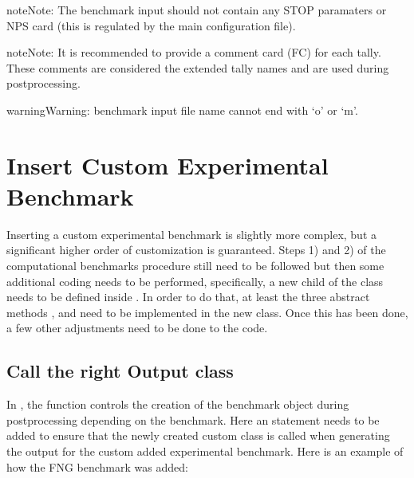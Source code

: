 \documentclass[letterpaper,10pt,english]{sphinxmanual}
\begin{document}
\begin{sphinxadmonition}{note}{Note:}
The benchmark input should not contain any STOP paramaters or NPS card (this is regulated by the
main configuration file).
\end{sphinxadmonition}

\begin{sphinxadmonition}{note}{Note:}
It is recommended to provide a comment card (FC) for each tally. These comments are considered the
extended tally names and are used during post\sphinxhyphen{}processing.
\end{sphinxadmonition}

\begin{sphinxadmonition}{warning}{Warning:}
benchmark input file name cannot end with ‘o’ or ‘m’.
\end{sphinxadmonition}


\section{Insert Custom Experimental Benchmark}
\label{\detokenize{dev/insertbenchmarks:insert-custom-experimental-benchmark}}\label{\detokenize{dev/insertbenchmarks:customexpbench}}
Inserting a custom experimental benchmark is slightly more complex, but a significant higher order
of customization is guaranteed.
Steps 1) and 2) of the computational benchmarks procedure still need to be followed but then some
additional coding needs to be performed, specifically, a new child of the {\hyperref[\detokenize{api/postprocessing:expoutputclass}]{}}
class needs to be defined inside .
In order to do that, at least the three abstract methods , 
and  need to be implemented in the new class.
Once this has been done, a few other adjustments need to be done to the code.


\subsection{Call the right Output class}
\label{\detokenize{dev/insertbenchmarks:call-the-right-output-class}}
In , the function  controls the creation of the
benchmark object during post\sphinxhyphen{}processing depending on the benchmark. Here an  statement needs
to be added to ensure that the newly created custom class is called when generating the output for
the custom added experimental benchmark. Here is an example of how the FNG benchmark was added:
\end{document}
